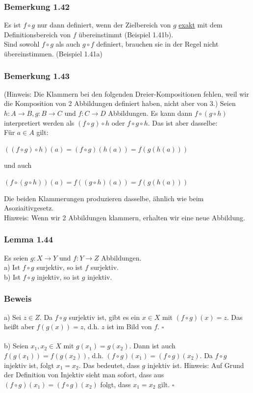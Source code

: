 \documentclass{article}
\begin{document}
\subsubsection*{Bemerkung 1.42}
Es ist $f \circ g$ nur dann definiert, wenn der Zielbereich von $g$ \underline{exakt} mit dem Definitionsbereich von $f$ übereinstimmt (Beispiel 1.41b). \\
Sind sowohl $f \circ g$ als auch $g \circ f$ definiert, brauchen sie in der Regel nicht übereinstimmen. (Beispiel 1.41a)\\

\subsubsection*{Bemerkung 1.43}
(Hinweis: Die Klammern bei den folgenden Dreier-Kompositionen fehlen, weil wir die Komposition von 2 Abbildungen definiert haben, nicht aber von 3.) Seien $h: A \rightarrow B, g: B \rightarrow C$ und $f: C \rightarrow D$ Abbildungen. Es kann dann $f \circ (g \circ h)$ interpretiert werden als $(f \circ g) \circ h$ oder $f \circ g \circ h$. Das ist aber dasselbe: \\
Für $a \in A$ gilt: 
\begin{center}
    $((f \circ g) \circ h)(a) = (f \circ g)(h(a)) = f(g(h(a)))$
\end{center}
und auch 
\begin{center}
    $(f \circ (g \circ h))(a) = f((g \circ h)(a)) = f(g(h(a)))$
\end{center}
Die beiden Klammerungen produzieren dasselbe, ähnlich wie beim Asoziaitivgesetz. \\
Hinweis: Wenn wir 2 Abbildungen klammern, erhalten wir eine neue Abbildung.


\subsubsection*{Lemma 1.44}
Es seien $g: X \rightarrow Y$ und $f: Y \rightarrow Z$ Abbildungen.\\
a) Ist $f \circ g$ surjektiv, so ist $f$ surjektiv. \\
b) Ist $f \circ g$ injektiv, so ist $g$ injektiv. \\

\subsubsection*{Beweis}
a) Sei $z \in Z$. Da $f \circ g$ surjektiv ist, gibt es ein $x \in X$ mit $(f \circ g)(x) = z$. Das heißt aber $f(g(x)) = z$, d.h. $z$ ist im Bild von $f$. $\square$ \\
\\
b) Seien $x_1, x_2 \in X$ mit $g(x_1) = g(x_2)$. Dann ist auch $f(g(x_1)) = f(g(x_2))$, d.h. $(f \circ g)(x_1) = (f \circ g)(x_2)$. Da $f \circ g$ injektiv ist, folgt $x_1 = x_2$. Das bedeutet, dass $g$ injektiv ist. Hinweis: 
Auf Grund der Definition von Injektiv sieht man sofort, dass aus $(f \circ g)(x_1) = (f \circ g)(x_2)$ folgt, dass $x_1 = x_2$ gilt. $\square$ \\
\end{document}
